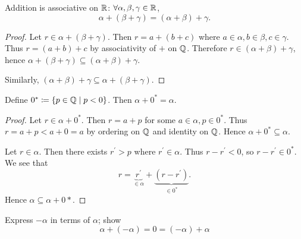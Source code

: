 \begin{proposition}
Addition is associative on $\mathbb R$: $\forall\alpha,\beta,\gamma\in\mathbb R$,
\[ \alpha+(\beta+\gamma)=(\alpha+\beta)+\gamma. \]
\end{proposition}

\begin{proof}
Let $r\in\alpha+(\beta+\gamma)$. Then $r=a+(b+c)$ where $a\in\alpha,b\in\beta,c\in\gamma$. Thus $r=(a+b)+c$ by associativity of $+$ on $\mathbb Q$. Therefore $r\in(\alpha+\beta)+\gamma$, hence $\alpha+(\beta+\gamma)\subseteq(\alpha+\beta)+\gamma$.

Similarly, $(\alpha+\beta)+\gamma\subseteq\alpha+(\beta+\gamma)$.
\end{proof}

\begin{proposition}
Define $0^*\coloneqq\{p\in\mathbb Q\mid p<0\}$. Then $\alpha+0^*=\alpha$.
\end{proposition}

\begin{proof}
Let $r\in\alpha+0^*$. Then $r=a+p$ for some $a\in\alpha,p\in0^*$. Thus $r=a+p<a+0=a$ by ordering on $\mathbb Q$ and identity on $\mathbb Q$. Hence $\alpha+0^*\subseteq\alpha$.

Let $r\in\alpha$. Then there exists $r^\prime>p$ where $r^\prime\in\alpha$. Thus $r-r^\prime<0$, so $r-r^\prime\in0^*$. We see that
\[ r=\underbrace{r^\prime}_{\in\alpha}+\underbrace{(r-r^\prime)}_{\in0^*}. \]
Hence $\alpha\subseteq\alpha+0*$.
\end{proof}


\begin{exercise}{}{}
Express $-\alpha$ in terms of $\alpha$; show
\[ \alpha+(-\alpha)=0=(-\alpha)+\alpha \]
\end{exercise}

